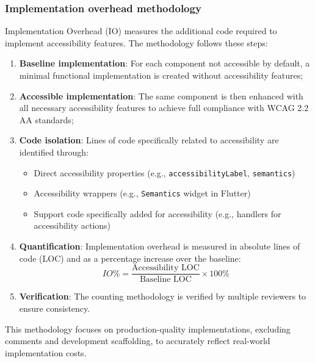 \subsubsection{Implementation overhead methodology}
\label{subsubsec:io-methodology}

Implementation Overhead (IO) measures the additional code required to implement accessibility features. The methodology follows these steps:

\begin{enumerate}
    \item \textbf{Baseline implementation}: For each component not accessible by default, a minimal functional implementation is created without accessibility features;
    
    \item \textbf{Accessible implementation}: The same component is then enhanced with all necessary accessibility features to achieve full compliance with WCAG 2.2 AA standards;
    
    \item \textbf{Code isolation}: Lines of code specifically related to accessibility are identified through:
    \begin{itemize}
        \item Direct accessibility properties (e.g., \texttt{accessibilityLabel}, \texttt{semantics})
        \item Accessibility wrappers (e.g., \texttt{Semantics} widget in Flutter)
        \item Support code specifically added for accessibility (e.g., handlers for accessibility actions)
    \end{itemize}
    
    \item \textbf{Quantification}: Implementation overhead is measured in absolute lines of code (LOC) and as a percentage increase over the baseline:
    \begin{equation}
    IO\% = \frac{\text{Accessibility LOC}}{\text{Baseline LOC}} \times 100\%
    \end{equation}
    
    \item \textbf{Verification}: The counting methodology is verified by multiple reviewers to ensure consistency.
\end{enumerate}

This methodology focuses on production-quality implementations, excluding comments and development scaffolding, to accurately reflect real-world implementation costs.

